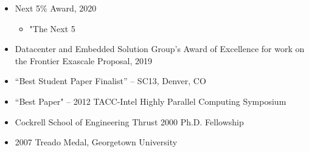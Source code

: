 \vspace{-0.3in}

\begin{itemize}
	\itemsep 0pt
	\item Next 5\% Award, 2020
	\begin{itemize}
	\item "The Next 5%
	\end{itemize}
	\item Datacenter and Embedded Solution Group’s Award of Excellence for work on the Frontier Exascale Proposal, 2019
        \item ``Best Student Paper Finalist'' -- SC13, Denver, CO
	\item ``Best Paper" -- 2012 TACC-Intel Highly Parallel Computing
	      Symposium 
        \item Cockrell School of Engineering Thrust 2000 Ph.D. Fellowship
        \item 2007 Treado Medal, Georgetown University      
\end{itemize}


